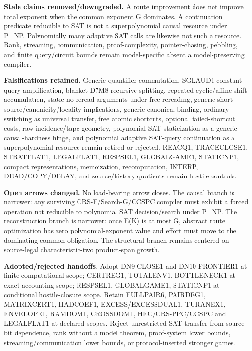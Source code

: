 \documentclass[11pt]{article}
\begin{document}
\textbf{Stale claims removed/downgraded.}
A route improvement does not improve total exponent when the common exponent G dominates. A continuation predicate reducible to SAT is not a superpolynomial causal resource under P=NP. Polynomially many adaptive SAT calls are likewise not such a resource. Rank, streaming, communication, proof-complexity, pointer-chasing, pebbling, and finite query/circuit bounds remain model-specific absent a model-preserving compiler.

\textbf{Falsifications retained.}
Generic quantifier commutation, SGLAUD1 constant-query amplification, blanket D7M8 recursive splitting, repeated cyclic/affine shift accumulation, static no-reread arguments under free rereading, generic short-source/canonicity/locality implications, generic canonical binding, ordinary switching as universal transfer, free atomic shortcuts, optional failed-shortcut costs, raw incidence/tape geometry, polynomial SAT staticization as a generic causal-hardness hinge, and polynomial adaptive SAT-query continuation as a superpolynomial resource remain retired or rejected. REACQ1, TRACECLOSE1, STRATFLAT1, LEGALFLAT1, RESPSEL1, GLOBALGAME1, STATICNP1, compact representations, memoization, recomputation, INTERP, DEAD/COPY/DELAY, and source/history quotients remain hostile controls.

\textbf{Open arrows changed.}
No load-bearing arrow closes. The causal branch is narrower: any surviving CRS-E/Search-G/CCSPC compiler must exhibit a forced operation not reducible to polynomial SAT decision/search under P=NP. The reconstruction branch is narrower: once E(K) is at most G, abstract route optimization has zero polynomial-exponent value and effort must move to the dominating common obligation. The structural branch remains centered on source-legal characteristic-two product-span growth.

\textbf{Adopted/rejected handoffs.}
Adopt DN9-CLOSE1 and DN10-FRONTIER1 at finite computational scope; CERTREG1, TOTALENV1, BOTTLENECK1 at exact accounting scope; RESPSEL1, GLOBALGAME1, STATICNP1 at conditional hostile-closure scope. Retain FULLPAIR6, PAIRDEG1, MATRIXCERT1, HADCOEF1, EXCESS/EXCESSDUAL1, TURANEX1, ENVELOPE1, RAMDOM1, CROSSDOM1, HEC/CRS-PPC/CCSPC and LEGALFLAT1 at declared scopes. Reject unrestricted-SAT transfer from source-bit dependence, rank without a model theorem, proof-system lower bounds, streaming/communication lower bounds, or protocol-inserted stronger games.
\end{document}
